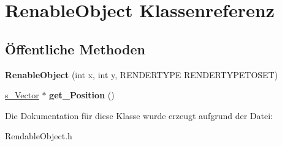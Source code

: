\hypertarget{class_renable_object}{\section{Renable\-Object Klassenreferenz}
\label{class_renable_object}
}
\subsection*{Öffentliche Methoden}
\begin{DoxyCompactItemize}
\item 
\hypertarget{class_renable_object_a19c91f8028fcebc338bc0d0bbbe34951}{{\bfseries Renable\-Object} (int x, int y, R\-E\-N\-D\-E\-R\-T\-Y\-P\-E R\-E\-N\-D\-E\-R\-T\-Y\-P\-E\-T\-O\-S\-E\-T)}\label{class_renable_object_a19c91f8028fcebc338bc0d0bbbe34951}

\item 
\hypertarget{class_renable_object_a31ee1f9fc1039eafa145fcac80685068}{\hyperlink{structs___vector}{s\-\_\-\-Vector} $\ast$ {\bfseries get\-\_\-\-Position} ()}\label{class_renable_object_a31ee1f9fc1039eafa145fcac80685068}

\end{DoxyCompactItemize}


Die Dokumentation für diese Klasse wurde erzeugt aufgrund der Datei\-:\begin{DoxyCompactItemize}
\item 
Rendable\-Object.\-h\end{DoxyCompactItemize}
